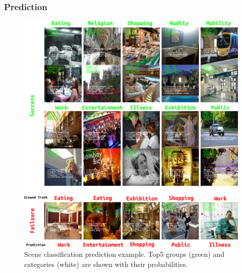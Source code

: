 \subsubsection{Prediction}

\begin{figure}[!t]
    \centering
    \includegraphics[width=\textwidth]{figure/ch4-scnpredictemp.png}
    \caption{Scene classification prediction example. Top5 groups (green) and categories (white) are shown with their probabilities.}
    \label{fig:ch4-scnpredictemp}
\end{figure}

